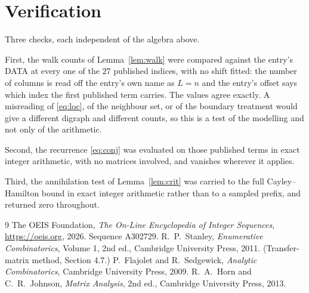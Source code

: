 \documentclass[11pt,a4paper]{article}
\theoremstyle{plain}
\theoremstyle{definition}
\begin{document}
\section{Verification}

Three checks, each independent of the algebra above.

First, the walk counts of Lemma~\ref{lem:walk} were compared against the entry's DATA at
every one of the $27$ published indices, with no shift fitted: the number of columns is
read off the entry's own name as $L=n$ and the entry's offset says which index the first
published term carries. The values agree exactly. A misreading of \eqref{eq:loc}, of the
neighbour set, or of the boundary treatment would give a different digraph and different
counts, so this is a test of the modelling and not only of the arithmetic.

Second, the recurrence \eqref{eq:conj} was evaluated on those published terms in exact
integer arithmetic, with no matrices involved, and vanishes wherever it applies.

Third, the annihilation test of Lemma~\ref{lem:crit} was carried to the full
Cayley--Hamilton bound in exact integer arithmetic rather than to a sampled prefix, and
returned zero throughout.

\begin{thebibliography}{9}
 The OEIS Foundation, \emph{The On-Line Encyclopedia of Integer
Sequences}, \url{https://oeis.org}, 2026. Sequence A302729.
 R.~P.~Stanley, \emph{Enumerative Combinatorics}, Volume 1, 2nd ed.,
Cambridge University Press, 2011. (Transfer-matrix method, Section 4.7.)
 P.~Flajolet and R.~Sedgewick, \emph{Analytic Combinatorics}, Cambridge
University Press, 2009.
 R.~A.~Horn and C.~R.~Johnson, \emph{Matrix Analysis}, 2nd ed., Cambridge
University Press, 2013.
\end{thebibliography}
\end{document}

